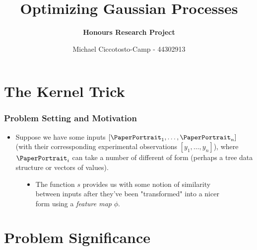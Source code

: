 \documentclass[9pt,hyperref={pdfpagelabels=false},xcolor=table]{beamer}
\title{Optimizing Gaussian Processes}
\author[Michael Ciccotosto-Camp]{{\bf Honours Research Project}}
\date{
Michael Ciccotosto-Camp - 44302913 \\
}
\begin{document}
\maketitle

\section{The Kernel Trick}

\begin{frame}
    \frametitle{Problem Setting and Motivation}
    \begin{itemize}
        \item Suppose we have some inputs $\left[ \text{\PaperPortrait}_1 , \ldots , \text{\PaperPortrait}_n \right]$ (with their corressponding experimental observations $\left[ y_1 , \ldots , y_n \right]$), where $\text{\PaperPortrait}_i$ can take a number of different of form (perhaps a tree data structure or vectors of values).
    \end{itemize}
    \begin{figure}[h]
        \centering
        \begin{itemize}
            \item The function $s$ provides us with some notion of similarity between inputs after they've been "transformed" into a nicer form using a {\it feature map} $\phi$.
        \end{itemize}
    \end{figure}
\end{frame}

\section{Problem Significance}
\end{document}
